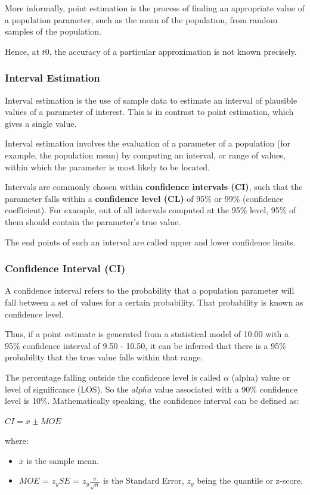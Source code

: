 \documentclass{article}
\begin{document}
More informally, point estimation is the process of finding an appropriate value of a population parameter, such as the mean of the population, from random samples of the population.


Hence, at $t0$, the accuracy of a particular approximation is not known precisely. 

\subsubsection{Interval Estimation}
Interval estimation is the use of sample data to estimate an interval of plausible values of a parameter of interest. This is in contrast to point estimation, which gives a single value.

Interval estimation involves the evaluation of a parameter of a population (for example, the population mean) by computing an interval, or range of values, within which the parameter is most likely to be located. 

Intervals are commonly chosen within \textbf{confidence intervals (CI)}, such that the parameter falls within a \textbf{confidence level (CL)} of 95\% or 99\% (confidence coefficient). For example, out of all intervals computed at the 95\% level, 95\% of them should contain the parameter's true value.

The end points of such an interval are called upper and lower confidence limits.

\subsubsection{Confidence Interval (CI)}
A confidence interval refers to the probability that a population parameter will fall between a set of values for a certain probability. That probability is known as confidence level.

Thus, if a point estimate is generated from a statistical model of 10.00 with a 95\% confidence interval of 9.50 - 10.50, it can be inferred that there is a 95\% probability that the true value falls within that range.

The percentage falling outside the confidence level is called $\alpha$ (alpha) value or level of significance (LOS). So the $alpha$ value associated with a 90\% confidence level is 10\%. 
Mathematically speaking, the confidence interval can be defined as:

$CI = \bar{x} \pm MOE$

where:
\begin{itemize}
    \item $\bar{x}$ is the sample mean.
    \item $MOE$ = $z_y SE$ = $z_y \frac{\sigma}{\sqrt{n}}$ is the Standard Error, $z_y$ being the quantile or z-score.
\end{itemize}
\end{document}
